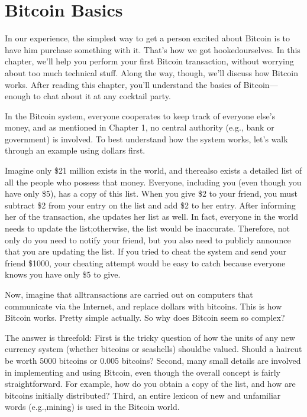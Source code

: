 \chapter{Bitcoin Basics}

\par In our experience, the simplest way to get a person excited about Bitcoin is to have him purchase something with it. That’s how we got hookedourselves. In this chapter, we’ll help you perform your first Bitcoin transaction, without worrying about too much technical stuff. Along the way, though, we’ll discuss how Bitcoin works. After reading this chapter, you’ll understand the basics of Bitcoin—enough to chat about it at any cocktail party.


\par In the Bitcoin system, everyone cooperates to keep track of everyone else’s money, and as mentioned in Chapter 1, no central authority (e.g., bank or government) is involved. To best understand how the system works, let’s walk through an example using dollars first.

\par Imagine only \$21 million exists in the world, and therealso exists a detailed list of all the people who possess that money. Everyone, including you (even though you have only \$5), has a copy of this list. When you give \$2 to your friend, you must subtract \$2 from your entry on the list and add \$2 to her entry. After informing her of the transaction, she updates her list as well. In fact, everyone in the world needs to update the list;otherwise, the list would be inaccurate. Therefore, not only do you need to notify your friend, but you also need to publicly announce that you are updating the list. If you tried to cheat the system and send your friend \$1000, your cheating attempt would be easy to catch because everyone knows you have only \$5 to give.

\par Now, imagine that alltransactions are carried out on computers that communicate via the Internet, and replace dollars with bitcoins. This is how Bitcoin works. Pretty simple actually. So why does Bitcoin seem so complex?

\par The answer is threefold: First is the tricky question of how the units of any new currency system (whether bitcoins or seashells) shouldbe valued. Should a haircut be worth 5000 bitcoins or 0.005 bitcoins? Second, many small details are involved in implementing and using Bitcoin, even though the overall concept is fairly straightforward. For example, how do you obtain a copy of the list, and how are bitcoins initially distributed? Third, an entire lexicon of new and unfamiliar words (e.g.,mining) is used in the Bitcoin world.

